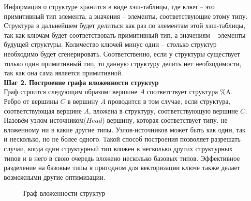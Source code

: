 Информация о структуре хранится в виде хэш-таблицы, где ключ -- это примитивный тип элемента, а значения -- элементы, соответствующие этому типу. Структура в дальнейшем будет делиться как раз по элементам этой хэш-таблицы, так как ключам будет соответствовать примитивный тип, а значениям -- элементы будущей структуры. 
Количество ключей минус один -- столько структур необходимо будет сгенерировать.
Соответственно, если у структуры существует только один примитивный тип, то данную структуру делить нет необходимости, так как она сама является примитивной.\\

\textbf{Шаг 2. Построение графа вложенности структур}\\

Граф строится следующим образом: вершине $A$ соответствует структура \%A. Ребро от вершины $C$ в вершину $A$ проводится в том случае, если структура, соответствующая вершине $A$, вложена в структуру, соответствующую вершине $C$. Назовём узлом-источником($Head$) вершину, которая соответствует типу, не вложенному ни в какие другие типы. Узлов-источников может быть как один, так и несколько, но не более одного. Такой способ построения позволяет разрешать случаи, когда один структурный тип вложен в несколько других структурных типов и в него в свою очередь вложено несколько базовых типов. Эффективное разделение на базовые типы в пригодном для векторизации ключе также делает возможными другие оптимизации.

\begin{figure}[ht]
    \caption{Граф вложенности структур}\label{fig:struct-orig}
\end{figure}

